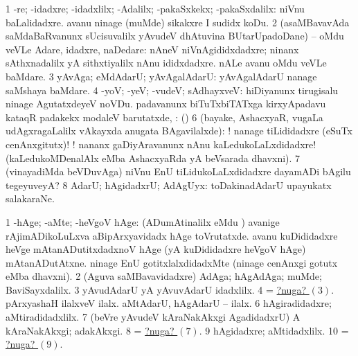 \bentry
{}
\gl{\saMavayx}
\bmng
\bnum
\num{1} -re; -idadxre; -idadxlilx; -Adalilx; -pakaSxkekx; -pakaSxdalilx:  niVnu baLalidadxre.  avanu ninage (muMde) sikakxre I sudidx koDu. 
\num{2} (asaMBavavAda saMdaBaRvanunx sUcisuvalilx yAvudeV dhAtuvina BUtarUpadoDane) -- oMdu veVLe Adare, idadxre, naDedare:  nAneV niVnAgididxdadxre; ninanx sAthxnadalilx yA sithxtiyalilx nAnu ididxdadxre.  nALe avanu oMdu veVLe baMdare. 
\num{3} yAvAga; eMdAdarU; yAvAgalAdarU:  yAvAgalAdarU nanage saMshaya baMdare. 
\num{4} -yoV; -yeV; -vudeV; sAdhayxveV:  hiDiyanunx tirugisalu ninage AgutatxdeyeV noVDu. 
\banum
{}  padavanunx biTuTxbiTATxga kirxyApadavu kataqR padakekx modaleV barutatxde, \udA:  
 (\kAparx)  
\eanum
\numie
\num{6} (bayake, AshacxyaR, \mo vugaLa udAgxragaLalilx vAkayxda anugata BAgavilalxde): ! nanage tiLididadxre (eSuTx cenAnxgitutx)! ! nananx gaDiyAravanunx nAnu kaLedukoLaLxdidadxre! (kaLedukoMDenalAlx eMba AshacxyaRda yA beVsarada dhavxni). 
\num{7} (vinayadiMda beVDuvAga)  niVnu EnU tiLidukoLaLxdidadxre dayamADi bAgilu tegeyuveyA? 
\num{8} AdarU; hAgidadxrU; AdAgUyx:  toDakinadAdarU upayukatx salakaraNe. 
\enum
\emng

\noindent
\gl{\pagu}
\bmng
\bnum
\num{1}  -hAge; -aMte; -heVgoV hAge:  (ADumAtinalilx  eMdu \parx)  avanige rAjimADikoLuLxva aBipArxyavidadx hAge toVrutatxde.  avanu kuDididadxre heVge mAtanADutitxdadxnoV hAge (yA kuDididadxre heVgoV hAge) mAtanADutAtxne.  ninage EnU gotitxlalxdidadxMte (ninage cenAnxgi gotutx eMba dhavxni). 
\num{2}  (Aguva saMBavavidadxre) AdAga; hAgAdAga; muMde; BaviSayxdalilx. 
\hypertarget{if nuga3}{} 
\num{3}  yAvudAdarU yA yAvuvAdarU idadxlilx. 
\num{4}  = \hyperlink{if nuga3}{?nuga? \((3)\)}. 
  
\banum
{} pArxyashaH ilalxveV ilalx. 
 aMtAdarU, hAgAdarU -- ilalx. 
\eanum
\numie
\num{6}  hAgiradidadxre; aMtiradidadxlilx. 
\hypertarget{if nuga7}{} 
\num{7}  (beVre yAvudeV kAraNakAkxgi AgadidadxrU) A kAraNakAkxgi; adakAkxgi. 
\num{8}  = \hyperlink{if nuga7}{?nuga? \((7)\)}. 
\hypertarget{if nuga9}{} 
\num{9}  hAgidadxre; aMtidadxlilx. 
\num{10}  = \hyperlink{if nuga9}{?nuga? \((9)\)}. 
\enum
\emng
\eentry

